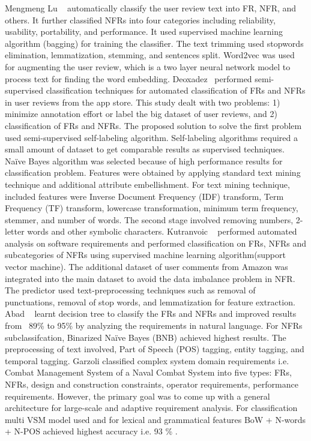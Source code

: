 Mengmeng Lu \etal~ \cite{Lu:2017} automatically classify the user review text into FR, NFR, and others. It further classified NFRs into four categories including reliability, usability, portability, and performance. It used supervised machine learning algorithm (bagging) for training the classifier. The text trimming used stopwords elimination, lemmatization, stemming, and sentences split. Word2vec was used for augmenting the user review, which is a two layer neural network model to process text for finding the word embedding. Deoxadez \etal~\cite{Deocadez:2017}performed semi-supervised classification techniques for automated classification of FRs and NFRs in user reviews from the app store. This study dealt with two problems: 1) minimize annotation effort or label the big dataset of user reviews, and 2) classification of FRs and NFRs. The proposed solution to solve the first problem used semi-supervised self-labeling algorithm. Self-labeling algorithms required a small amount of dataset to get comparable results as supervised techniques. Naïve Bayes algorithm was selected because of high performance results for classification problem. Features were obtained by applying standard text mining technique and additional attribute embellishment. For text mining technique, included features were Inverse Document Frequency (IDF) transform, Term Frequency (TF) transform, lowercase transformation, minimum term frequency, stemmer, and number of words. The second stage involved removing numbers, 2- letter words and other symbolic characters. Kutranvoic \etal ~ \cite {Kurtanovic:2017}performed automated analysis on software requirements and performed classification on FRs, NFRs and subcategories of NFRs using supervised machine learning algorithm(support vector machine). The additional dataset of user comments from Amazon was integrated into the main dataset to avoid the data imbalance problem in NFR. The predictor used text-preprocessing techniques such as removal of punctuations, removal of stop words, and lemmatization for feature extraction. Abad                       
\etal ~ \cite{Abad:2017} learnt decision tree to classify the FRs and NFRs and improved results from ~89\% to 95\% by analyzing the requirements in natural language. For NFRs subclassifcation, Binarized Naïve Bayes (BNB) achieved highest results. The preprocessing of text involved, Part of Speech (POS) tagging, entity tagging, and temporal tagging. Garzoli \cite {Garzoli:2013} classified complex system domain requirements i.e. Combat Management System of a Naval Combat System into five types: FRs, NFRs, design and construction constraints, operator requirements, performance requirements. However, the primary goal was to come up with a general architecture for large-scale and adaptive requirement analysis. For classification multi VSM model used and for lexical and grammatical features BoW + N-words + N-POS achieved highest accuracy i.e. 93 \% .



